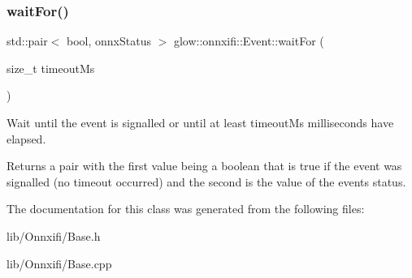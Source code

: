\subsubsection{\texorpdfstring{wait\+For()}{waitFor()}}
{\footnotesize\ttfamily std\+::pair$<$ bool, onnx\+Status $>$ glow\+::onnxifi\+::\+Event\+::wait\+For (\begin{DoxyParamCaption}\item[{size\+\_\+t}]{timeout\+Ms }\end{DoxyParamCaption})}

Wait until the event is signalled or until at least {\ttfamily timeout\+Ms} milliseconds have elapsed. \begin{DoxyReturn}{Returns}
a pair with the first value being a boolean that is true if the event was signalled (no timeout occurred) and the second is the value of the event\textquotesingle{}s status. 
\end{DoxyReturn}


The documentation for this class was generated from the following files\+:\begin{DoxyCompactItemize}
\item 
lib/\+Onnxifi/Base.\+h\item 
lib/\+Onnxifi/Base.\+cpp\end{DoxyCompactItemize}
